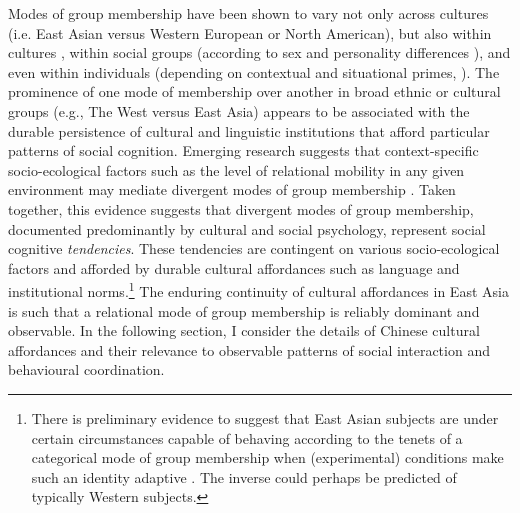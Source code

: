 \begin{CJK}{UTF8}{gbsn}
Modes of group membership have been shown to vary not only across cultures (i.e. East Asian versus Western European or North American), but also within cultures \citep{Henrich2014}, within social groups (according to sex and personality differences \citep{Yuki2014}), and even within individuals (depending on contextual and situational primes, \citep{Lee2014,Wong2005}).  The prominence of one mode of membership over another in broad ethnic or cultural groups (e.g., The West versus East Asia) appears to be associated with the durable persistence of cultural and linguistic institutions that afford particular patterns of social cognition.  Emerging research suggests that context-specific socio-ecological factors such as the level of relational mobility in any given environment may mediate divergent modes of group membership \citep{Oishi2010,Takagishi2014,Yuki2005}.
Taken together, this evidence suggests that divergent modes of group membership, documented predominantly by cultural and social psychology, represent social cognitive \textit{tendencies}. These tendencies are contingent on various socio-ecological factors and afforded by durable cultural affordances such as language and institutional norms.\footnote{There is preliminary evidence to suggest that East Asian subjects are under certain circumstances capable of behaving according to the tenets of a categorical mode of group membership when (experimental) conditions make such an identity adaptive \citep{Hong2000}. The inverse could perhaps be predicted of typically Western subjects.}  The enduring continuity of cultural affordances in East Asia is such that a relational mode of group membership is reliably dominant and observable.  In the following section, I consider the details of Chinese cultural affordances and their relevance to observable patterns of social interaction and behavioural coordination.


\end{CJK}
